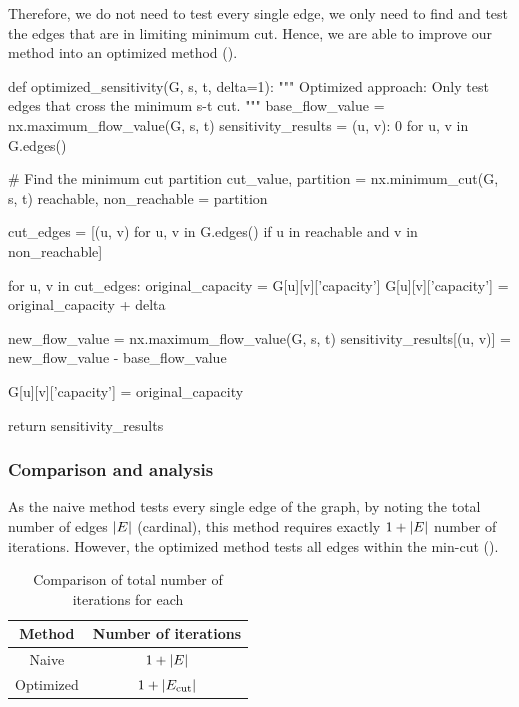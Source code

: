 \documentclass[12pt, openany]{article}
\begin{document}
Therefore, we do not need to test every single edge, we only need to find and test the edges that are in limiting minimum cut. Hence, we are able to improve our method into an optimized method ().

\begin{python}[caption={Python code for the naive approach},  label={lst:1_optimized_method}]
def optimized_sensitivity(G, s, t, delta=1):
    """
    Optimized approach: Only test edges that cross the minimum s-t cut.
    """
    base_flow_value = nx.maximum_flow_value(G, s, t)
    sensitivity_results = { (u, v): 0 for u, v in G.edges() }
        
    # Find the minimum cut partition
    cut_value, partition = nx.minimum_cut(G, s, t)
    reachable, non_reachable = partition
    
    cut_edges = [(u, v) for u, v in G.edges() if u in reachable and v in non_reachable]
            
    for u, v in cut_edges:
        original_capacity = G[u][v]['capacity']
        G[u][v]['capacity'] = original_capacity + delta
        
        new_flow_value = nx.maximum_flow_value(G, s, t)
        sensitivity_results[(u, v)] = new_flow_value - base_flow_value
        
        G[u][v]['capacity'] = original_capacity
        
    return sensitivity_results
\end{python}

\subsubsection{Comparison and analysis}

As the naive method tests every single edge of the graph, by noting the total number of edges $\abs{E}$ (cardinal), this method requires exactly $1+\abs{E}$ number of iterations. However, the optimized method tests all edges within the min-cut ().

\begin{table}[H]
    \centering
    \begin{tabular}{c | c}
         Method & Number of iterations \\
         \hline
         Naive & $1 + \abs{E}$\\
         Optimized & $1 + \abs{E_{\text{cut}}}$
    \end{tabular}
    \caption{Comparison of total number of iterations for each}
    \label{tab:nb_iterations_methods_1}
\end{table}
\end{document}
